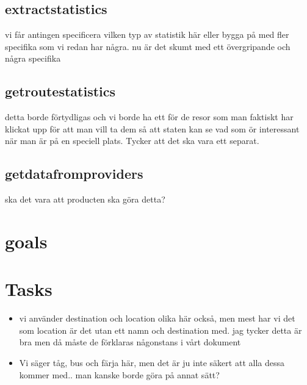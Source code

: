 \documentclass[a4paper]{article}
\begin{document}
	\subsection{extractstatistics}
vi får antingen specificera vilken typ av statistik  här eller bygga på med  fler specifika som vi redan har några. nu är det skumt med ett övergripande och några specifika
		
	\subsection{getroutestatistics}
	detta borde förtydligas och vi borde ha ett för de resor som man faktiskt har klickat upp för att man vill ta dem så att staten kan se vad som ör interessant när man är på en speciell plats. Tycker att det ska vara ett separat.
	
	\subsection{getdatafromproviders}
	ska det vara att producten ska göra detta?
	
\section{goals}


\section{Tasks}

\begin{itemize}
	\item vi använder destination och location olika här också, men mest har vi det som location är det utan ett namn och destination med. jag tycker detta är bra men då måste de förklaras någonstans i vårt dokument

	\item Vi säger tåg, bus och färja här, men det är ju inte säkert att alla dessa kommer med.. man kanske borde göra på annat sätt?


\end{itemize}
\end{document}
